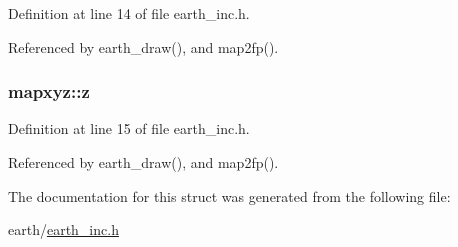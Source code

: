 Definition at line 14 of file earth\-\_\-inc.\-h.



Referenced by earth\-\_\-draw(), and map2fp().

\hypertarget{structmapxyz_a96c5540931e4b70342cad5f87917cb4d}{
\subsubsection[{z}]{ mapxyz\-::z}}\label{structmapxyz_a96c5540931e4b70342cad5f87917cb4d}


Definition at line 15 of file earth\-\_\-inc.\-h.



Referenced by earth\-\_\-draw(), and map2fp().



The documentation for this struct was generated from the following file\-:\begin{DoxyCompactItemize}
\item 
earth/\hyperlink{earth__inc_8h}{earth\-\_\-inc.\-h}\end{DoxyCompactItemize}
